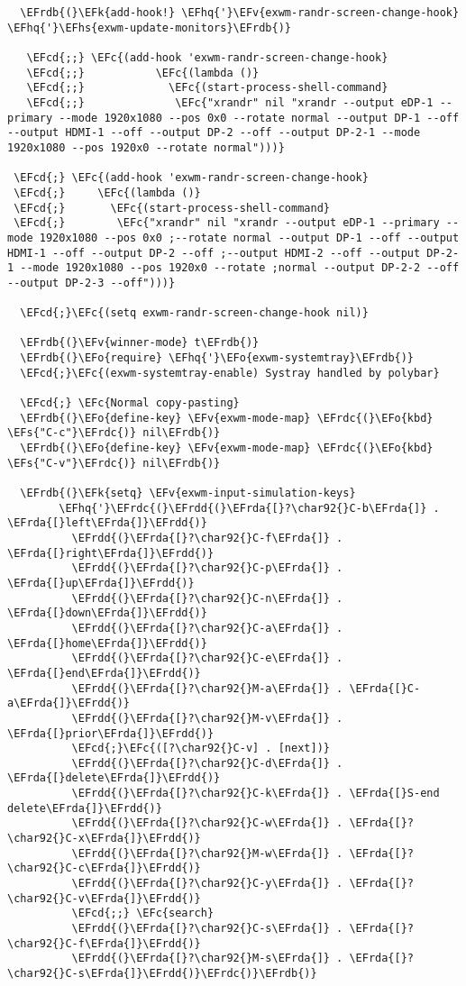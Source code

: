 \documentclass[a4wide,10pt]{article}
\newcommand{\EFc}[1]{\textcolor{EFc}{#1}} %
\newcommand{\EFcd}[1]{\textcolor{EFcd}{#1}} %
\newcommand{\EFs}[1]{\textcolor{EFs}{#1}} %
\newcommand{\EFk}[1]{\textcolor{EFk}{#1}} %
\newcommand{\EFv}[1]{\textcolor{EFv}{#1}} %
\newcommand{\EFo}[1]{\textcolor{EFo}{#1}} %
\newcommand{\EFhq}[1]{\textcolor{EFhq}{#1}} %
\newcommand{\EFhs}[1]{\textcolor{EFhs}{#1}} %
\newcommand{\EFrda}[1]{\textcolor{EFrda}{#1}} %
\newcommand{\EFrdb}[1]{\textcolor{EFrdb}{#1}} %
\newcommand{\EFrdc}[1]{\textcolor{EFrdc}{#1}} %
\newcommand{\EFrdd}[1]{\textcolor{EFrdd}{#1}} %
\begin{document}
\begin{Code}
\begin{Verbatim}
  \EFrdb{(}\EFk{add-hook!} \EFhq{'}\EFv{exwm-randr-screen-change-hook} \EFhq{'}\EFhs{exwm-update-monitors}\EFrdb{)}

   \EFcd{;;} \EFc{(add-hook 'exwm-randr-screen-change-hook}
   \EFcd{;;}           \EFc{(lambda ()}
   \EFcd{;;}             \EFc{(start-process-shell-command}
   \EFcd{;;}              \EFc{"xrandr" nil "xrandr --output eDP-1 --primary --mode 1920x1080 --pos 0x0 --rotate normal --output DP-1 --off --output HDMI-1 --off --output DP-2 --off --output DP-2-1 --mode 1920x1080 --pos 1920x0 --rotate normal")))}

 \EFcd{;} \EFc{(add-hook 'exwm-randr-screen-change-hook}
 \EFcd{;}     \EFc{(lambda ()}
 \EFcd{;}       \EFc{(start-process-shell-command}
 \EFcd{;}        \EFc{"xrandr" nil "xrandr --output eDP-1 --primary --mode 1920x1080 --pos 0x0 ;--rotate normal --output DP-1 --off --output HDMI-1 --off --output DP-2 --off ;--output HDMI-2 --off --output DP-2-1 --mode 1920x1080 --pos 1920x0 --rotate ;normal --output DP-2-2 --off --output DP-2-3 --off")))}

  \EFcd{;}\EFc{(setq exwm-randr-screen-change-hook nil)}

  \EFrdb{(}\EFv{winner-mode} t\EFrdb{)}
  \EFrdb{(}\EFo{require} \EFhq{'}\EFo{exwm-systemtray}\EFrdb{)}
  \EFcd{;}\EFc{(exwm-systemtray-enable) Systray handled by polybar}

  \EFcd{;} \EFc{Normal copy-pasting}
  \EFrdb{(}\EFo{define-key} \EFv{exwm-mode-map} \EFrdc{(}\EFo{kbd} \EFs{"C-c"}\EFrdc{)} nil\EFrdb{)}
  \EFrdb{(}\EFo{define-key} \EFv{exwm-mode-map} \EFrdc{(}\EFo{kbd} \EFs{"C-v"}\EFrdc{)} nil\EFrdb{)}

  \EFrdb{(}\EFk{setq} \EFv{exwm-input-simulation-keys}
        \EFhq{'}\EFrdc{(}\EFrdd{(}\EFrda{[}?\char92{}C-b\EFrda{]} . \EFrda{[}left\EFrda{]}\EFrdd{)}
          \EFrdd{(}\EFrda{[}?\char92{}C-f\EFrda{]} . \EFrda{[}right\EFrda{]}\EFrdd{)}
          \EFrdd{(}\EFrda{[}?\char92{}C-p\EFrda{]} . \EFrda{[}up\EFrda{]}\EFrdd{)}
          \EFrdd{(}\EFrda{[}?\char92{}C-n\EFrda{]} . \EFrda{[}down\EFrda{]}\EFrdd{)}
          \EFrdd{(}\EFrda{[}?\char92{}C-a\EFrda{]} . \EFrda{[}home\EFrda{]}\EFrdd{)}
          \EFrdd{(}\EFrda{[}?\char92{}C-e\EFrda{]} . \EFrda{[}end\EFrda{]}\EFrdd{)}
          \EFrdd{(}\EFrda{[}?\char92{}M-a\EFrda{]} . \EFrda{[}C-a\EFrda{]}\EFrdd{)}
          \EFrdd{(}\EFrda{[}?\char92{}M-v\EFrda{]} . \EFrda{[}prior\EFrda{]}\EFrdd{)}
          \EFcd{;}\EFc{([?\char92{}C-v] . [next])}
          \EFrdd{(}\EFrda{[}?\char92{}C-d\EFrda{]} . \EFrda{[}delete\EFrda{]}\EFrdd{)}
          \EFrdd{(}\EFrda{[}?\char92{}C-k\EFrda{]} . \EFrda{[}S-end delete\EFrda{]}\EFrdd{)}
          \EFrdd{(}\EFrda{[}?\char92{}C-w\EFrda{]} . \EFrda{[}?\char92{}C-x\EFrda{]}\EFrdd{)}
          \EFrdd{(}\EFrda{[}?\char92{}M-w\EFrda{]} . \EFrda{[}?\char92{}C-c\EFrda{]}\EFrdd{)}
          \EFrdd{(}\EFrda{[}?\char92{}C-y\EFrda{]} . \EFrda{[}?\char92{}C-v\EFrda{]}\EFrdd{)}
          \EFcd{;;} \EFc{search}
          \EFrdd{(}\EFrda{[}?\char92{}C-s\EFrda{]} . \EFrda{[}?\char92{}C-f\EFrda{]}\EFrdd{)}
          \EFrdd{(}\EFrda{[}?\char92{}M-s\EFrda{]} . \EFrda{[}?\char92{}C-s\EFrda{]}\EFrdd{)}\EFrdc{)}\EFrdb{)}


\end{Verbatim}
\end{Code}
\end{document}
